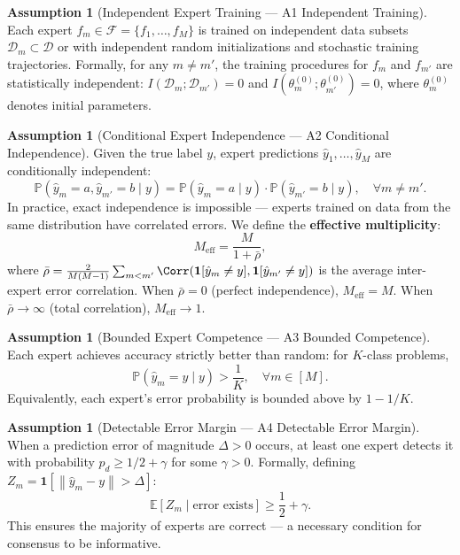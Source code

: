 \documentclass[12pt,a4paper]{article}
\theoremstyle{definition}
\newtheorem{assumption}[theorem]{Assumption}
\newcommand{\E}{\mathbb{E}}
\newcommand{\Pbb}{\mathbb{P}}
\newcommand{\cD}{\mathcal{D}}
\newcommand{\cF}{\mathcal{F}}
\newcommand{\ind}[1]{\mathbf{1}[#1]}
\newcommand{\norm}[1]{\left\lVert#1\right\rVert}
\begin{document}
\begin{assumption}[Independent Expert Training — A1 Independent Training]
\label{asm:A1}
Each expert $f_m \in \cF = \{f_1, \ldots, f_M\}$ is trained on independent data subsets $\cD_m \subset \cD$ or with independent random initializations and stochastic training trajectories. Formally, for any $m \neq m'$, the training procedures for $f_m$ and $f_{m'}$ are statistically independent: $I(\cD_m; \cD_{m'}) = 0$ and $I(\theta_m^{(0)}; \theta_{m'}^{(0)}) = 0$, where $\theta_m^{(0)}$ denotes initial parameters.
\end{assumption}

\begin{assumption}[Conditional Expert Independence — A2 Conditional Independence]
\label{asm:A2}
Given the true label $y$, expert predictions $\hat{y}_1, \ldots, \hat{y}_M$ are conditionally independent:
\[
\Pbb(\hat{y}_m = a, \hat{y}_{m'} = b \mid y) = \Pbb(\hat{y}_m = a \mid y) \cdot \Pbb(\hat{y}_{m'} = b \mid y), \quad \forall m \neq m'.
\]
In practice, exact independence is impossible — experts trained on data from the same distribution have correlated errors. We define the \textbf{effective multiplicity}:
\begin{equation}\label{eq:Meff}
    M_{\text{eff}} = \frac{M}{1 + \bar{\rho}},
\end{equation}
where $\bar{\rho} = \frac{2}{M(M-1)}\sum_{m<m'}\Corr(\ind{\hat{y}_m \neq y}, \ind{\hat{y}_{m'} \neq y})$ is the average inter-expert error correlation. When $\bar{\rho} = 0$ (perfect independence), $M_{\text{eff}} = M$. When $\bar{\rho} \to \infty$ (total correlation), $M_{\text{eff}} \to 1$.
\end{assumption}

\begin{assumption}[Bounded Expert Competence — A3 Bounded Competence]
\label{asm:A3}
Each expert achieves accuracy strictly better than random: for $K$-class problems,
\[
\Pbb(\hat{y}_m = y \mid y) > \frac{1}{K}, \quad \forall m \in [M].
\]
Equivalently, each expert's error probability is bounded above by $1 - 1/K$.
\end{assumption}

\begin{assumption}[Detectable Error Margin — A4 Detectable Error Margin]
\label{asm:A4}
When a prediction error of magnitude $\Delta > 0$ occurs, at least one expert detects it with probability $p_d \ge 1/2 + \gamma$ for some $\gamma > 0$. Formally, defining $Z_m = \ind{\norm{\hat{y}_m - y} > \Delta}$:
\[
\E[Z_m \mid \text{error exists}] \ge \frac{1}{2} + \gamma.
\]
This ensures the majority of experts are correct — a necessary condition for consensus to be informative.
\end{assumption}
\end{document}
